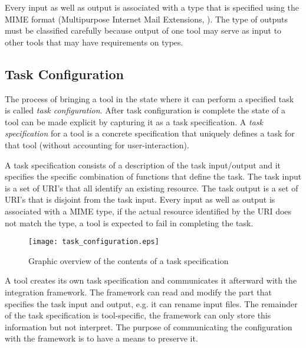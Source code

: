 \documentclass{article}
\begin{document}
   Every input as well as output is associated with a type that is specified
   using the MIME format (Multipurpose Internet Mail Extensions, \cite{rfc2822}).
   The type of outputs must be classified carefully because output of one tool
   may serve as input to other tools that may have requirements on types.

  \subsection{Task Configuration} \label{concepts::task_configuration}

   
   The process of bringing a tool in the state where it can perform a specified
   task is called \textit{task configuration}. After task configuration is
   complete the state of a tool can be made explicit by capturing it as a task
   specification.  A \textit{task specification} for a tool is a concrete
   specification that uniquely defines a task for that tool (without accounting
   for user-interaction).

   \noindent A task specification consists of a description of the task
   input/output and it specifies the specific combination of functions that
   define the task. The task input is a set of URI's that all identify an
   existing resource. The task output is a set of URI's that is disjoint from
   the task input. Every input as well as output is associated with a MIME
   type, if the actual resource identified by the URI does not match the type, a
   tool is expected to fail in completing the task.

   \begin{figure}[H]
    \begin{center}
     \texttt{[image: task\_configuration.eps]}
    \end{center}
    \caption{Graphic overview of the contents of a task specification}
   \end{figure}

 
   A tool creates its own task specification and communicates it afterward
   with the integration framework. The framework can read and modify the part
   that specifies the task input and output, e.g. it can rename input files.
   The remainder of the task specification is tool-specific, the framework can
   only store this information but not interpret. The purpose of communicating
   the configuration with the framework is to have a means to preserve it.
   
\end{document}
